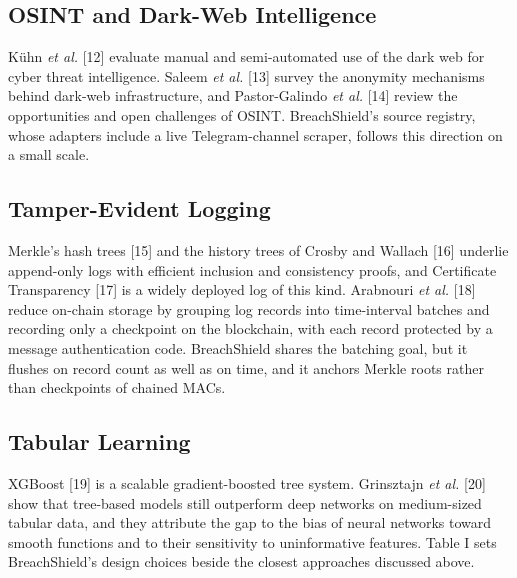 \documentclass[10pt,twocolumn]{article}
\begin{document}
\subsection{OSINT and Dark-Web Intelligence}

K\"uhn \textit{et al.} [12] evaluate manual and semi-automated use of the dark web for cyber threat intelligence. Saleem \textit{et al.} [13] survey the anonymity mechanisms behind dark-web infrastructure, and Pastor-Galindo \textit{et al.} [14] review the opportunities and open challenges of OSINT. BreachShield's source registry, whose adapters include a live Telegram-channel scraper, follows this direction on a small scale.

\subsection{Tamper-Evident Logging}

Merkle's hash trees [15] and the history trees of Crosby and Wallach [16] underlie append-only logs with efficient inclusion and consistency proofs, and Certificate Transparency [17] is a widely deployed log of this kind. Arabnouri \textit{et al.} [18] reduce on-chain storage by grouping log records into time-interval batches and recording only a checkpoint on the blockchain, with each record protected by a message authentication code. BreachShield shares the batching goal, but it flushes on record count as well as on time, and it anchors Merkle roots rather than checkpoints of chained MACs.

\subsection{Tabular Learning}

XGBoost [19] is a scalable gradient-boosted tree system. Grinsztajn \textit{et al.} [20] show that tree-based models still outperform deep networks on medium-sized tabular data, and they attribute the gap to the bias of neural networks toward smooth functions and to their sensitivity to uninformative features. Table I sets BreachShield's design choices beside the closest approaches discussed above.
\end{document}
